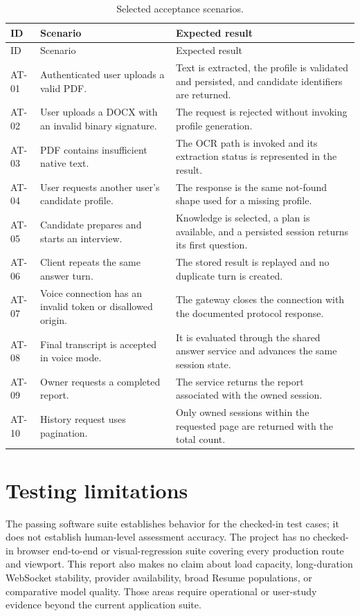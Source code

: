\begin{longtable}{p{}p{}p{}}
\caption{Selected acceptance scenarios.}\label{tab:acceptance-scenarios}\\
\toprule ID & Scenario & Expected result\\ \midrule\endfirsthead
\toprule ID & Scenario & Expected result\\ \midrule\endhead
AT-01 & Authenticated user uploads a valid PDF. & Text is extracted, the profile is validated and persisted, and candidate identifiers are returned.\\
AT-02 & User uploads a DOCX with an invalid binary signature. & The request is rejected without invoking profile generation.\\
AT-03 & PDF contains insufficient native text. & The OCR path is invoked and its extraction status is represented in the result.\\
AT-04 & User requests another user's candidate profile. & The response is the same not-found shape used for a missing profile.\\
AT-05 & Candidate prepares and starts an interview. & Knowledge is selected, a plan is available, and a persisted session returns its first question.\\
AT-06 & Client repeats the same answer turn. & The stored result is replayed and no duplicate turn is created.\\
AT-07 & Voice connection has an invalid token or disallowed origin. & The gateway closes the connection with the documented protocol response.\\
AT-08 & Final transcript is accepted in voice mode. & It is evaluated through the shared answer service and advances the same session state.\\
AT-09 & Owner requests a completed report. & The service returns the report associated with the owned session.\\
AT-10 & History request uses pagination. & Only owned sessions within the requested page are returned with the total count.\\
\bottomrule
\end{longtable}

\section{Testing limitations}

The passing software suite establishes behavior for the checked-in test cases; it does not establish human-level assessment accuracy. The project has no checked-in browser end-to-end or visual-regression suite covering every production route and viewport. This report also makes no claim about load capacity, long-duration WebSocket stability, provider availability, broad Resume populations, or comparative model quality. Those areas require operational or user-study evidence beyond the current application suite.
